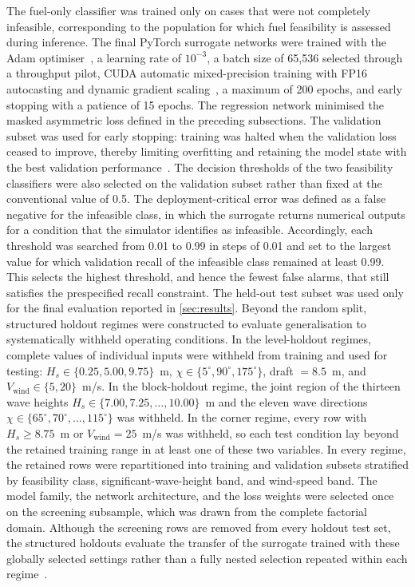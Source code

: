\documentclass[final,5p,times,twocolumn,numbers]{elsarticle}
\begin{document}
The fuel-only classifier was trained only on cases that were not completely infeasible, corresponding to the population for which fuel feasibility is assessed during inference. The final PyTorch surrogate networks were trained with the Adam optimiser~\cite{kingma2015}, a learning rate of $10^{-3}$, a batch size of 65{,}536 selected through a throughput pilot, CUDA automatic mixed-precision training with FP16 autocasting and dynamic gradient scaling~\cite{micikevicius2018mixedprecision}, a maximum of 200 epochs, and early stopping with a patience of 15 epochs. The regression network minimised the masked asymmetric loss defined in the preceding subsections. The validation subset was used for early stopping: training was halted when the validation loss ceased to improve, thereby limiting overfitting and retaining the model state with the best validation performance~\cite{prechelt1998}. The decision thresholds of the two feasibility classifiers were also selected on the validation subset rather than fixed at the conventional value of 0.5. The deployment-critical error was defined as a false negative for the infeasible class, in which the surrogate returns numerical outputs for a condition that the simulator identifies as infeasible. Accordingly, each threshold was searched from 0.01 to 0.99 in steps of 0.01 and set to the largest value for which validation recall of the infeasible class remained at least 0.99. This selects the highest threshold, and hence the fewest false alarms, that still satisfies the prespecified recall constraint. The held-out test subset was used only for the final evaluation reported in \autoref{sec:results}.
Beyond the random split, structured holdout regimes were constructed to evaluate generalisation to systematically withheld operating conditions. In the level-holdout regimes, complete values of individual inputs were withheld from training and used for testing: $H_s\in\{0.25,5.00,9.75\}$~m, $\chi\in\{5^\circ,90^\circ,175^\circ\}$, draft $=8.5$~m, and $V_{\mathrm{wind}}\in\{5,20\}$~m/s. In the block-holdout regime, the joint region of the thirteen wave heights $H_s\in\{7.00,7.25,\dots,10.00\}$~m and the eleven wave directions $\chi\in\{65^\circ,70^\circ,\dots,115^\circ\}$ was withheld. In the corner regime, every row with $H_s\geq8.75$~m or $V_{\mathrm{wind}}=25$~m/s was withheld, so each test condition lay beyond the retained training range in at least one of these two variables. In every regime, the retained rows were repartitioned into training and validation subsets stratified by feasibility class, significant-wave-height band, and wind-speed band. The model family, the network architecture, and the loss weights were selected once on the screening subsample, which was drawn from the complete factorial domain. Although the screening rows are removed from every holdout test set, the structured holdouts evaluate the transfer of the surrogate trained with these globally selected settings rather than a fully nested selection repeated within each regime~\cite{cawley2010selection}.
\end{document}

